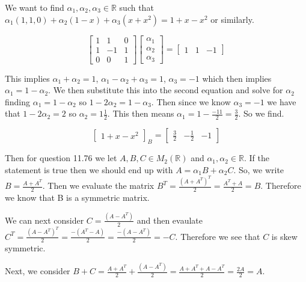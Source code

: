 \documentclass{article}
\begin{document}
We want to find $\alpha_1, \alpha_2, \alpha_3 \in \mathbb{R}$ such that $\alpha_1 (1,1,0) + \alpha_2(1-x) +\alpha_3 (x + x^2) = 1 + x - x^2$ or similarly.

\begin{equation}
    \begin{bmatrix}
        1 & 1 & 0 \\ 1& -1& 1 \\ 0 &0 &1
    \end{bmatrix}
    \begin{bmatrix}
        \alpha_1 \\ \alpha_2 \\ \alpha_3
    \end{bmatrix}
    =
    \begin{bmatrix}
        1 &1& -1
    \end{bmatrix}
\end{equation}

This implies $\alpha_1 + \alpha_2 = 1$, $\alpha_1 - \alpha_2 + \alpha_3 = 1$, $\alpha_3 = -1$ which then implies $\alpha_1 = 1- \alpha_2$. 
We then substitute this into the second equation and solve for $\alpha_2$ finding $\alpha_1 = 1-\alpha_2$ so $1-2\alpha_2 = 1-\alpha_3$. 
Then since we know $\alpha_3 = -1$ we have that $1-2\alpha_2 = 2$ so $\alpha_2 = 1\frac{1}{2}$. This then means $\alpha_1 = 1- \frac{-11}{2} = \frac{3}{2}$. So we find.

\begin{equation}
    \begin{bmatrix}
        1 + x -x^2
    \end{bmatrix}_B
    =
    \begin{bmatrix}
        \frac{3}{2} & -\frac{1}{2} & -1
    \end{bmatrix}
\end{equation}

Then for question 11.76 we let $A,B,C \in M_2(\mathbb{R})$ and $\alpha_1, \alpha_2 \in \mathbb{R}$. If the statement is true then we should end up with $A = \alpha_1B +\alpha_2 C$. So, we write $B = \frac{A + A^T}{2}$. Then we evaluate the matrix $B^T = \frac{(A+A^T)^T}{2} = \frac{ A^T + A}{2} = B$. Therefore we know that B is a symmetric matrix. 

We can next consider $C = \frac{(A-A^T)}{2}$ and then evaulate $C^T = \frac{(A-A^T)^T}{2} = \frac{-(A^T - A)}{2} = \frac{-(A-A^T)}{2} = -C$. Therefore we see that $C$ is skew symmetric. 

Next, we consider $B+C = \frac{A + A^T}{2} + \frac{(A-A^T)}{2} = \frac{A+A^T+A-A^T}{2} = \frac{2A}{2} = A$.
\end{document}

